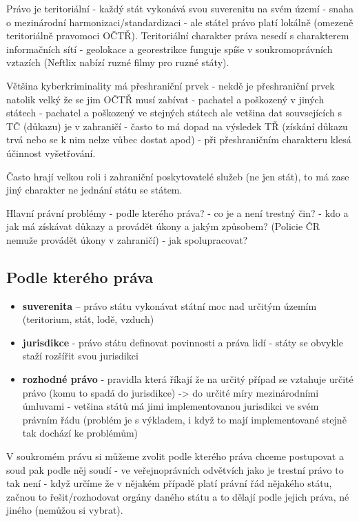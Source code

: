Právo je teritoriální - každý stát vykonává svou suverenitu na svém území - snaha o mezinárodní harmonizaci/standardizaci - ale státel právo platí lokálně (omezeně teritoriálně pravomoci OČTŘ).
Teritoriální charakter práva nesedí s charakterem informačních sítí - geolokace a georestrikce funguje spíše v soukromoprávních vztazích (Neftlix nabízí ruzné filmy pro ruzné státy).

Většina kyberkriminality má přeshraniční prvek - nekdě je přeshraniční prvek natolik velký že se
jim OČTŘ musí zabívat - pachatel a poškozený v jiných státech - pachatel a poškozený ve stejných
státech ale vetšina dat souvsejících s TČ (důkazu) je v zahraničí - často to má dopad na výsledek TŘ
(získání důkazu trvá nebo se k nim nelze vůbec dostat apod) - při přeshraničním charakteru klesá
účinnost vyšetřování.

Často hrají velkou roli i zahraniční poskytovatelé služeb (ne jen stát), to má zase jiný charakter ne
jednání státu se státem.

Hlavní právní problémy - podle kterého práva? - co je a není trestný čin? - kdo a jak má získávat
důkazy a provádět úkony a jakým způsobem? (Policie ČR nemuže provádět úkony v zahraničí) - jak
spolupracovat?

\subsection{Podle kterého práva}
\begin{itemize}
    \item \textbf{suverenita} -- právo státu vykonávat státní moc nad určitým územím (teritorium, stát, lodě, vzduch)
    \item \textbf{jurisdikce} - právo státu definovat povinnosti a práva lidí - státy se obvykle staží rozšířit svou jurisdikci
    \item \textbf{rozhodné právo} - pravidla která říkají že na určitý případ se vztahuje určité právo (komu to spadá do jurisdikce) -> do určité míry mezinárodními úmluvami - vetšina států má jimi implementovanou jurisdikci ve svém právním řádu (problém je s výkladem, i když to mají implementované stejně tak dochází ke problémům)
\end{itemize}
V soukromém právu si můžeme zvolit podle kterého práva chceme postupovat a soud pak podle něj soudí - ve veřejnoprávních odvětvích jako je trestní právo to tak není - když určíme že v nějakém případě platí právní řád nějakého státu, začnou to řešit/rozhodovat orgány daného státu a to dělají podle jejich práva, né jiného (nemůžou si vybrat).

